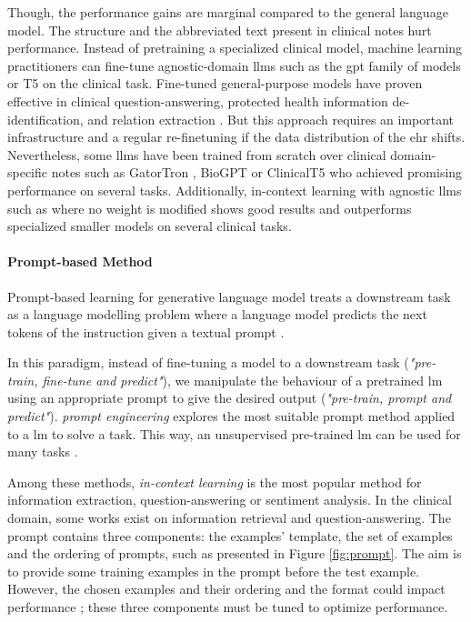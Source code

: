 Though, the performance gains are marginal compared to the general language model. The structure and the abbreviated text present in clinical notes hurt performance.
Instead of pretraining a specialized clinical model, machine learning practitioners can fine-tune agnostic-domain \glspl{llm} such as the \gls{gpt} family of models or T5 on the clinical task. Fine-tuned general-purpose models have proven effective in clinical question-answering, protected health information de-identification, and relation extraction \citep{Lehman2023DoModels}. But this approach requires an important infrastructure and a regular re-finetuning if the data distribution of the \gls{ehr} shifts. Nevertheless, some \glspl{llm} have been trained from scratch over clinical domain-specific notes such as GatorTron \citep{yang2022large}, BioGPT \citep{Luo2022BioGPT:Mining} or ClinicalT5 \citep{Lu2022ClinicalT5:Text} who achieved promising performance on several tasks.
Additionally, in-context learning with agnostic \glspl{llm} such as \instruct \citep{ouyang2022training} where no weight is modified shows good results \citep{Agrawal2022LargeExtractors, brown2020language} and outperforms specialized smaller models on several clinical tasks.
\paragraph{Prompt-based Method}
Prompt-based learning for generative language model treats a downstream task as a language modelling problem where a language model predicts the next tokens of the instruction given a textual prompt \citep{Sainz2021LabelExtraction}.

In this paradigm, instead of fine-tuning a model to a downstream task (\textit{"pre-train, fine-tune and predict"}), we manipulate the behaviour of a pretrained \gls{lm} using an appropriate prompt to give the desired output (\textit{"pre-train, prompt and predict"}). 
\textit{prompt engineering} explores the most suitable prompt method applied to a \gls{lm} to solve a task.
This way, an unsupervised pre-trained \gls{lm} can be used for many tasks \citep{Liu2023Pre-trainProcessing}.

Among these methods, \textit{in-context learning} is the most popular method for information extraction, question-answering or sentiment analysis. In the clinical domain, some works exist on information retrieval and question-answering. The prompt contains three components: the examples' template, the set of examples and the ordering of prompts, such as presented in Figure \ref{fig:prompt}. The aim is to provide some training examples in the prompt before the test example. However, the chosen examples and their ordering and the format could impact performance \citep{Zhao2021CalibrateModels}; these three components must be tuned to optimize performance.

